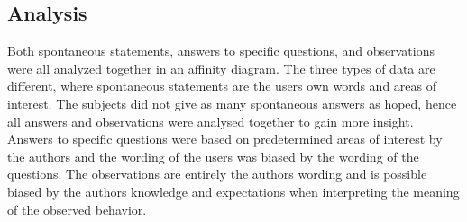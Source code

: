 \subsection{Analysis}
Both spontaneous statements, answers to specific questions, and observations were all analyzed together in an affinity diagram. The three types of data are different, where spontaneous statements are the users own words and areas of interest. The subjects did not give as many spontaneous answers as hoped, hence all answers and observations were analysed together to gain more insight. Answers to specific questions were based on predetermined areas of interest by the authors and the wording of the users was biased by the wording of the questions. The observations are entirely the authors wording and is possible biased by the authors knowledge and expectations when interpreting the meaning of the observed behavior.